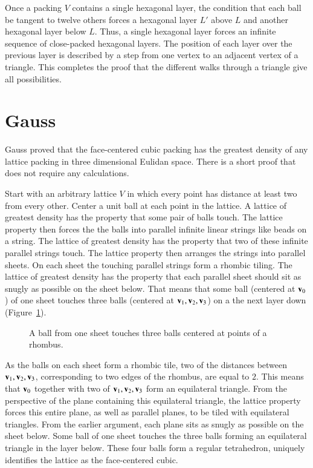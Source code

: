 Once a packing $V$ contains a single hexagonal layer, the condition
that each ball be tangent to twelve others forces a hexagonal layer
$L'$ above $L$ and another hexagonal layer below $L$.  Thus, a single
hexagonal layer forces an infinite sequence of close-packed hexagonal
layers.  The position of each layer over the previous layer is described by
a step from one vertex to an adjacent vertex of a triangle.
This completes the proof that the different walks through a triangle give
all possibilities.



\section{Gauss}

Gauss proved that the face-centered cubic packing has the greatest density
of any lattice packing in three dimensional Eulidan space.  There is a
short proof that does not require any calculations.

Start with an arbitrary lattice $V$ in which every point has distance
at least two from every other.  Center a unit ball at each point in
the lattice.  A lattice of greatest density has the property that some
pair of balls touch.  The lattice property then forces the the balls
into parallel infinite linear strings like beads on a string.  The
lattice of greatest density has the property that two of these
infinite parallel strings touch.  The lattice property then arranges
the strings into parallel sheets.  On each sheet the touching parallel
strings form a rhombic tiling.  The lattice of greatest density has
the property that each parallel sheet should sit as snugly as possible
on the sheet below.  That means that some ball (centered at ${\mathbf v}_0$) of
one sheet touches three balls (centered at ${\mathbf v}_1,{\mathbf v}_2,{\mathbf v}_3$) on a the
next layer down (Figure~\ref{fig:rhombus}).

\begin{figure}[htb]
  \centering
  \caption{A ball from one sheet touches three balls centered at points of a rhombus.}
  \label{fig:rhombus}
\end{figure}

As the balls on each sheet form a rhombic tile, two of the distances
between ${\mathbf v}_1,{\mathbf v}_2,{\mathbf v}_3$, corresponding to two edges of the rhombus, are
equal to $2$.  This means that ${\mathbf v}_0$ together with two of
${\mathbf v}_1,{\mathbf v}_2,{\mathbf v}_3$ form an equilateral triangle.  From the perspective of
the plane containing this equilateral triangle, the lattice property
forces this entire plane, as well as parallel planes, to be tiled with
equilateral triangles.  From the earlier argument, each plane sits as
snugly as possible on the sheet below.  Some ball of one sheet touches
the three balls forming an equilateral triangle in the layer below.
These four balls form a regular tetrahedron,
uniquely identifies the lattice as the face-centered cubic.






